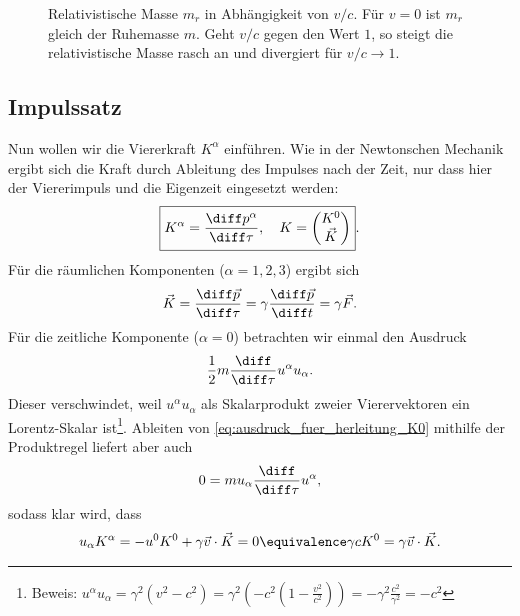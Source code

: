 \begin{figure}[htb]
    \centering
    \tfigIncreaseOfRelativisticMass
    \caption{Relativistische Masse $m_r$ in Abhängigkeit von $v/c$. Für $v=0$ ist $m_r$ gleich der Ruhemasse $m$. Geht $v/c$ gegen den Wert $1$, so steigt die relativistische Masse rasch an und divergiert für $v/c\rightarrow 1$.}
    \label{fig:zunahme_impulsmasse}
\end{figure}



\subsection{Impulssatz}

Nun wollen wir die Viererkraft $K^\alpha$ einführen. Wie in der Newtonschen Mechanik ergibt sich die Kraft durch Ableitung des Impulses nach der Zeit, nur dass hier der Viererimpuls und die Eigenzeit eingesetzt werden:
\begin{align}
    \label{eq:impulssatz}
    \boxed{K^\alpha = \frac{\diff p^\alpha}{\diff\tau},  \quad K=\begin{pmatrix} K^0\\ \vec K \end{pmatrix}}.
\end{align}
Für die räumlichen Komponenten ($\alpha=1,2,3$) ergibt sich
\begin{align*}
    \vec K = \frac{\diff\vec p}{\diff\tau} = \gamma \frac{\diff\vec p}{\diff t} = \gamma\vec F.
\end{align*}
Für die zeitliche Komponente ($\alpha=0$) betrachten wir einmal den Ausdruck
\begin{align}
    \label{eq:ausdruck_fuer_herleitung_K0}
    \frac{1}{2}m\frac{\diff}{\diff\tau}u^\alpha u_\alpha.
\end{align}
Dieser verschwindet, weil $u^\alpha u_\alpha$ als Skalarprodukt zweier Vierervektoren ein Lorentz-Skalar ist\footnote{Beweis: $u^\alpha u_\alpha=\gamma^2(v^2-c^2)=\gamma^2\left(-c^2\left(1-\frac{v^2}{c^2}\right)\right)=-\gamma^2 \frac{c^2}{\gamma^2}=-c^2$}.
Ableiten von \eqref{eq:ausdruck_fuer_herleitung_K0} mithilfe der Produktregel liefert aber auch
\begin{align*}
    0 = m u_\alpha\frac{\diff}{\diff\tau}u^\alpha,
\end{align*}
sodass klar wird, dass
\begin{align*}
    u_\alpha K^\alpha = -u^0 K^0 + \gamma\vec v\cdot \vec K = 0 \equivalence \gamma c K^0=\gamma\vec v\cdot \vec K.
\end{align*}
